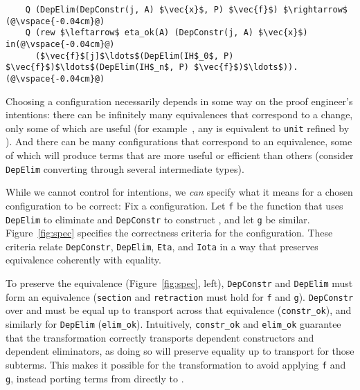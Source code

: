 \begin{figure*}
\begin{minipage}{0.56\textwidth}
\begin{lstlisting}
    Q (DepElim(DepConstr(j, A) $\vec{x}$, P) $\vec{f}$) $\rightarrow$ (@\vspace{-0.04cm}@)
    Q (rew $\leftarrow$ eta_ok(A) (DepConstr(j, A) $\vec{x}$) in(@\vspace{-0.04cm}@)
      ($\vec{f}$[j]$\ldots$(DepElim(IH$_0$, P) $\vec{f}$)$\ldots$(DepElim(IH$_n$, P) $\vec{f}$)$\ldots$)).(@\vspace{-0.04cm}@)
\end{lstlisting}
\end{minipage}
\vspace{-0.2cm}
\caption{Correctness criteria for a configuration to ensure that the transformation
preserves equivalence (left) coherently with equality (right, shown for \Aa; \B is similar). \lstinline{f} and \lstinline{g} are defined in text. $s$, $\vec{f}$, $\vec{x}$, and $\vec{\mathtt{IH}}$ represent
sorts, eliminator cases, constructor arguments, and inductive hypotheses. $\xi$ $(A,$ $P,$ $j)$ is the type 
of \lstinline{DepElim(A, P)} at \lstinline{DepConstr(j, A)} (similarly for \B).} %
\label{fig:spec}
\end{figure*}

Choosing a configuration necessarily depends in some way on the proof engineer's intentions:
there can be infinitely many equivalences that correspond to a 
change, only some of which are useful (for example~\href{https://github.com/uwplse/pumpkin-pi/blob/v2.0.0/plugin/coq/playground/refine_unit.v}{}, any \Aa is equivalent to \lstinline{unit} refined by \Aa). %
And there can be many configurations that correspond
to an equivalence, some of which will produce terms that are more useful or efficient than others
(consider \lstinline{DepElim} converting through several intermediate types).

While we cannot control for intentions, we \textit{can} specify what it means for a chosen configuration to be correct:
Fix a configuration. Let \lstinline{f} be the function that uses \lstinline{DepElim} to eliminate \Aa and \lstinline{DepConstr} to construct \B,
and let \lstinline{g} be similar.
Figure~\ref{fig:spec} specifies the correctness criteria for the configuration.
These criteria relate \lstinline{DepConstr}, \lstinline{DepElim}, \lstinline{Eta}, and \lstinline{Iota}
in a way that preserves equivalence coherently with equality.

To preserve the equivalence (Figure~\ref{fig:spec}, left), \lstinline{DepConstr} and \lstinline{DepElim} must form an equivalence
(\lstinline{section} and \lstinline{retraction} must hold for \lstinline{f} and \lstinline{g}).
\lstinline{DepConstr} over \Aa and \B must be equal up to transport across that equivalence (\lstinline{constr_ok}), 
and similarly for \lstinline{DepElim} (\lstinline{elim_ok}).
Intuitively, \lstinline{constr_ok} and \lstinline{elim_ok} guarantee that the transformation
correctly transports dependent constructors and dependent eliminators,
as doing so will preserve equality up to transport for those subterms.
This makes it possible for the transformation
to avoid applying \lstinline{f} and \lstinline{g}, instead porting terms from \Aa directly to \B.

